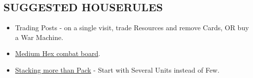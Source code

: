 \begin{multicols*}{2}
\subsection*{\MakeUppercase{Suggested Houserules}}
\begin{itemize}
  \item Trading Posts - on a single visit, trade Resources and remove Cards, OR buy a War Machine. %
  \item \href{https://boardgamegeek.com/thread/3445901/custom-hex-combat-board}{Medium Hex combat board}.
  \item \href{https://boardgamegeek.com/thread/3449937/houserule-for-stacking-more-than-pack}{Stacking more than Pack} - Start with Several  Units instead of Few.
\end{itemize}

\vspace*{\fill}

\end{multicols*}

